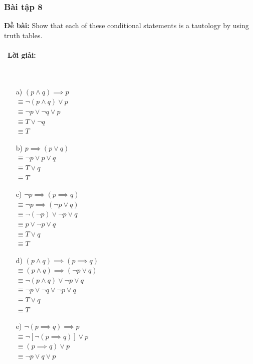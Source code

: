 \documentclass[a4paper]{article}
\begin{document}
\subsubsection{Bài tập 8}
\textbf{Đề bài:} Show that each of these conditional statements is a tautology by using truth tables.
\\\ \\\
\textbf{Lời giải:} \\\ \\\
	\begin{enumerate}
		\item [a)]  $(p \land q) \implies p$ \\
					$\equiv \lnot(p \land q) \lor p$ \\
					$\equiv \lnot p \lor \lnot q \lor p $\\
					$\equiv T \lor \lnot q $\\
					$\equiv T$\\
		\item [b)]  $p \implies (p \lor q) $\\
					$\equiv  \lnot p \lor p \lor q $\\
					$\equiv  T \lor q $\\
					$\equiv T $\\
		\item [c)]  $\lnot p \implies (p \implies q) $ \\
					$\equiv \lnot p \implies (\lnot p \lor q )$\\
					$\equiv  \lnot (\lnot p) \lor \lnot p \lor q $\\
					$\equiv  p \lor \lnot p \lor q $\\ $\equiv T \lor q $\\
					$\equiv T$\\
		\item[d)]   $(p \land q) \implies (p \implies q)$\\
					$\equiv (p \land q) \implies (\lnot p \lor q) $\\
					$\equiv  \lnot (p \land q ) \lor \lnot p \lor q $\\
					$\equiv \lnot p \lor \lnot q \lor \lnot p \lor q $\\
					$\equiv T \lor q $\\
					$\equiv T$\\
		\item[e)]   $\lnot (p \implies q) \implies p $\\
					$\equiv \lnot [\lnot(p \implies q)] \lor p $\\
					$\equiv (p \implies q) \lor p $\\ $\equiv \lnot p \lor q \lor p $\\

\end{enumerate}
\end{document}
